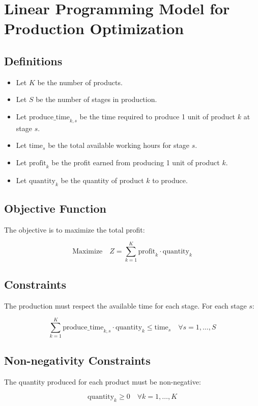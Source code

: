 \documentclass{article}
\begin{document}
\section*{Linear Programming Model for Production Optimization}

\subsection*{Definitions}
\begin{itemize}
    \item Let \( K \) be the number of products.
    \item Let \( S \) be the number of stages in production.
    \item Let \( \text{produce\_time}_{k,s} \) be the time required to produce 1 unit of product \( k \) at stage \( s \).
    \item Let \( \text{time}_{s} \) be the total available working hours for stage \( s \).
    \item Let \( \text{profit}_{k} \) be the profit earned from producing 1 unit of product \( k \).
    \item Let \( \text{quantity}_{k} \) be the quantity of product \( k \) to produce.
\end{itemize}

\subsection*{Objective Function}
The objective is to maximize the total profit:

\[
\text{Maximize} \quad Z = \sum_{k=1}^{K} \text{profit}_{k} \cdot \text{quantity}_{k}
\]

\subsection*{Constraints}
The production must respect the available time for each stage. For each stage \( s \):

\[
\sum_{k=1}^{K} \text{produce\_time}_{k,s} \cdot \text{quantity}_{k} \leq \text{time}_{s} \quad \forall s = 1, \ldots, S
\]

\subsection*{Non-negativity Constraints}
The quantity produced for each product must be non-negative:

\[
\text{quantity}_{k} \geq 0 \quad \forall k = 1, \ldots, K
\]
\end{document}
